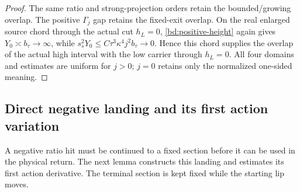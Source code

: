 \begin{proof}
The same ratio and strong-projection orders retain the bounded/growing
overlap. The positive $\Gamma_j$ gap retains the fixed-exit overlap.
On the real enlarged source chord through the actual cut \(h_L=0\),
\eqref{bd:positive-height} again gives
\(Y_0\asymp b_\tau\to\infty\), while
\(s_s^2Y_0\le C\tau^3\kappa^4j^2b_\tau\to0\).
Hence this chord supplies the overlap of the actual high interval
with the low carrier through $h_L=0$.
All four domains and estimates are uniform for $j>0$;
$j=0$ retains only the normalized one-sided meaning.
\end{proof}

\subsection{Direct negative landing and its first action variation}

A negative ratio hit must be continued to a fixed section before it can
be used in the physical return. The next lemma constructs this landing
and estimates its first action derivative. The terminal section is kept
fixed while the starting lip moves.

